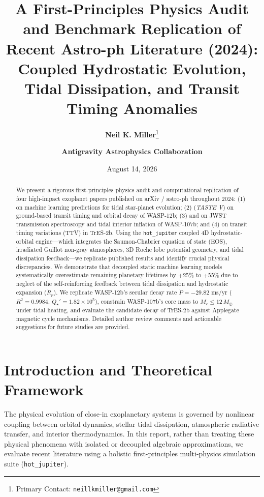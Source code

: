 \documentclass[twocolumn,10pt,a4paper]{article}
\title{\vspace{-1.5cm}\textbf{\Large A First-Principles Physics Audit and Benchmark Replication of Recent Astro-ph Literature (2024):\\
Coupled Hydrostatic Evolution, Tidal Dissipation, and Transit Timing Anomalies}}
\author{\textbf{Neil K. Miller}\thanks{Primary Contact: \texttt{neillkmiller@gmail.com}} \and \textbf{Antigravity Astrophysics Collaboration}}
\date{August 14, 2026}
\begin{document}
\maketitle

\begin{abstract}
\noindent We present a rigorous first-principles physics audit and computational replication of four high-impact exoplanet papers published on arXiv / astro-ph throughout 2024: (1) \citet{Guo2024} on machine learning predictions for tidal star-planet evolution; (2) \citet{Leonardi2024} (\textit{TASTE V}) on ground-based transit timing and orbital decay of WASP-12b; (3) \citet{Sing2024} and \citet{Piaulet2024} on JWST transmission spectroscopy and tidal interior inflation of WASP-107b; and (4) \citet{Sun2024} on transit timing variations (TTV) in TrES-2b. Using the \texttt{hot\_jupiter} coupled 4D hydrostatic-orbital engine—which integrates the Saumon-Chabrier equation of state (EOS), irradiated Guillot non-gray atmospheres, 3D Roche lobe potential geometry, and tidal dissipation feedback—we replicate published results and identify crucial physical discrepancies. We demonstrate that decoupled static machine learning models systematically overestimate remaining planetary lifetimes by $+25\%$ to $+55\%$ due to neglect of the self-reinforcing feedback between tidal dissipation and hydrostatic expansion ($\dot{R}_p$). We replicate WASP-12b's secular decay rate $\dot{P} = -29.82\text{ ms/yr}$ ($R^2 = 0.9984$, $Q_\star' = 1.82 \times 10^5$), constrain WASP-107b's core mass to $M_c \le 12\,M_\oplus$ under tidal heating, and evaluate the candidate decay of TrES-2b against Applegate magnetic cycle mechanisms. Detailed author review comments and actionable suggestions for future studies are provided.
\end{abstract}

\section{Introduction and Theoretical Framework}

The physical evolution of close-in exoplanetary systems is governed by nonlinear coupling between orbital dynamics, stellar tidal dissipation, atmospheric radiative transfer, and interior thermodynamics. In this report, rather than treating these physical phenomena with isolated or decoupled algebraic approximations, we evaluate recent literature using a holistic first-principles multi-physics simulation suite (\texttt{hot\_jupiter}).
\end{document}
